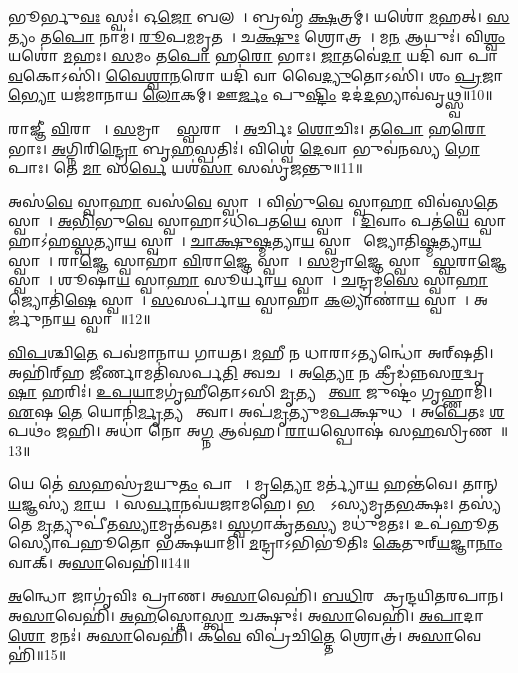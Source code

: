    𑌭𑍂𑌰𑍍𑌭𑍁\ul{𑌵𑌃} 𑌸𑍍𑌵𑌃॑।
   𑌓\ul{𑌜𑍋} 𑌬𑌲𑌮𑍍᳚।
   𑌬𑍍𑌰𑌹𑍍𑌮॑ \ul{𑌕𑍍𑌷}𑌤𑍍𑌰𑌮𑍍।
   𑌯𑌶𑍋॑ \ul{𑌮}𑌹𑌤𑍍।
   \ul{𑌸}𑌤𑍍𑌯𑌂 𑌤\ul{𑌪𑍋} 𑌨𑌾𑌮॑।
   \ul{𑌰𑍂}𑌪\ul{𑌮}𑌮𑍃𑌤𑌮𑍍᳚।
   𑌚\ul{𑌕𑍍𑌷𑍁𑌃} 𑌶𑍍𑌰𑍋𑌤𑍍𑌰𑌮𑍍᳚।
   𑌮\ul{𑌨} 𑌆𑌯𑍁𑌃॑।
   𑌵𑌿\ul{𑌶𑍍𑌵𑌂} 𑌯𑌶𑍋॑ \ul{𑌮}𑌹𑌃।
   \ul{𑌸}𑌮𑌂 𑌤\ul{𑌪𑍋} 𑌹\ul{𑌰𑍋} 𑌭𑌾𑌃।
   \ul{𑌜𑌾}𑌤𑌵𑍇॑\ul{𑌦𑌾} 𑌯𑌦𑌿॑ 𑌵𑌾 𑌪𑌾\ul{𑌵}𑌕𑍋𑌽𑌸𑌿॑।
   \ul{𑌵𑍈}\ul{𑌶𑍍𑌵𑌾}\ul{𑌨}𑌰𑍋 𑌯𑌦𑌿॑ 𑌵𑌾 𑌵𑍈\ul{𑌦𑍍𑌯𑍁}𑌤𑍋𑌽𑌸𑌿॑।
   𑌶𑌂 \ul{𑌪𑍍𑌰}𑌜𑌾\ul{𑌭𑍍𑌯𑍋} 𑌯𑌜॑𑌮𑌾𑌨𑌾𑌯 \ul{𑌲𑍋}𑌕𑌮𑍍।
   𑌊\ul{𑌰𑍍𑌜𑌂} 𑌪𑍁\ul{𑌷𑍍𑌟𑌿𑌂} 𑌦𑌦॑\ul{𑌦}𑌭𑍍𑌯𑌾𑌵॑𑌵𑍃𑌥𑍍𑌸𑍍𑌵॥10॥
   \anuvakamend

   𑌰𑌾𑌜𑍍𑌞𑍀॑ \ul{𑌵𑌿}𑌰𑌾𑌜𑍍𑌞𑍀᳚।
   \ul{𑌸}𑌮𑍍𑌰𑌾𑌜𑍍𑌞𑍀᳚ \ul{𑌸𑍍𑌵}𑌰𑌾𑌜𑍍𑌞𑍀᳚।
   \ul{𑌅}𑌰𑍍𑌚𑌿𑌃 \ul{𑌶𑍋}𑌚𑌿𑌃।
   𑌤\ul{𑌪𑍋} 𑌹\ul{𑌰𑍋} 𑌭𑌾𑌃।
   \ul{𑌅}𑌗𑍍𑌨𑌿𑌰𑌿\ul{𑌨𑍍𑌦𑍍𑌰𑍋} 𑌬𑍃\ul{𑌹}𑌸𑍍𑌪𑌤𑌿𑌃॑।
   𑌵𑌿𑌶𑍍𑌵𑍇॑ \ul{𑌦𑍇}𑌵𑌾 𑌭𑍁𑌵॑𑌨𑌸𑍍𑌯 \ul{𑌗𑍋}𑌪𑌾𑌃।
   𑌤𑍇 \ul{𑌮𑌾} 𑌸\ul{𑌰𑍍𑌵𑍇} 𑌯𑌶॑\ul{𑌸𑌾} 𑌸𑌸𑍃॑𑌜𑌨𑍍𑌤𑍁॥11॥
\anuvakamend

   𑌅𑌸॑\ul{𑌵𑍇} 𑌸𑍍𑌵𑌾\ul{𑌹𑌾} 𑌵𑌸॑\ul{𑌵𑍇} 𑌸𑍍𑌵𑌾𑌹𑌾᳚।
   𑌵𑌿𑌭𑍁॑\ul{𑌵𑍇} 𑌸𑍍𑌵𑌾\ul{𑌹𑌾} 𑌵𑌿𑌵॑𑌸𑍍𑌵\ul{𑌤𑍇} 𑌸𑍍𑌵𑌾𑌹𑌾᳚।
   \ul{𑌅}\ul{𑌭𑌿}𑌭𑍁\ul{𑌵𑍇} 𑌸𑍍𑌵𑌾𑌹𑌾𑌽𑌧𑌿॑𑌪𑌤\ul{𑌯𑍇} 𑌸𑍍𑌵𑌾𑌹𑌾᳚।
   \ul{𑌦𑌿}𑌵𑌾𑌂 𑌪𑌤॑\ul{𑌯𑍇} 𑌸𑍍𑌵𑌾𑌹𑌾𑌽॑𑌹\ul{𑌸𑍍𑌪}𑌤𑍍𑌯𑌾\ul{𑌯} 𑌸𑍍𑌵𑌾𑌹𑌾᳚।
   \ul{𑌚𑌾}\ul{𑌕𑍍𑌷𑍁}\ul{𑌷𑍍𑌮}𑌤𑍍𑌯𑌾\ul{𑌯} 𑌸𑍍𑌵𑌾𑌹𑌾᳚ 𑌜𑍍𑌯𑍋𑌤𑌿\ul{𑌷𑍍𑌮}𑌤𑍍𑌯𑌾\ul{𑌯} 𑌸𑍍𑌵𑌾𑌹𑌾᳚।
   𑌰𑌾\ul{𑌜𑍍𑌞𑍇} 𑌸𑍍𑌵𑌾𑌹𑌾॑ \ul{𑌵𑌿}𑌰𑌾\ul{𑌜𑍍𑌞𑍇} 𑌸𑍍𑌵𑌾𑌹𑌾᳚।
   \ul{𑌸}𑌮𑍍𑌰𑌾\ul{𑌜𑍍𑌞𑍇} 𑌸𑍍𑌵𑌾𑌹𑌾᳚ \ul{𑌸𑍍𑌵}𑌰𑌾\ul{𑌜𑍍𑌞𑍇} 𑌸𑍍𑌵𑌾𑌹𑌾᳚।
   𑌶𑍂𑌷𑌾॑\ul{𑌯} 𑌸𑍍𑌵𑌾\ul{𑌹𑌾} 𑌸𑍂𑌰𑍍𑌯𑌾॑\ul{𑌯} 𑌸𑍍𑌵𑌾𑌹𑌾᳚।
   \ul{𑌚}𑌨𑍍𑌦𑍍𑌰𑌮॑\ul{𑌸𑍇} 𑌸𑍍𑌵𑌾\ul{𑌹𑌾} 𑌜𑍍𑌯𑍋𑌤𑌿॑\ul{𑌷𑍇} 𑌸𑍍𑌵𑌾𑌹𑌾᳚।
   \ul{𑌸}\ul{}𑌸𑌰𑍍𑌪𑌾॑\ul{𑌯} 𑌸𑍍𑌵𑌾𑌹𑌾॑ \ul{𑌕}𑌲𑍍𑌯𑌾𑌣𑌾॑\ul{𑌯} 𑌸𑍍𑌵𑌾𑌹𑌾᳚।
   𑌅𑌰𑍍𑌜𑍁॑𑌨𑌾\ul{𑌯} 𑌸𑍍𑌵𑌾𑌹𑌾᳚॥12॥
\anuvakamend

   \ul{𑌵𑌿}\ul{𑌪}𑌶𑍍𑌚𑌿\ul{𑌤𑍇} 𑌪𑌵॑𑌮𑌾𑌨𑌾𑌯 𑌗𑌾𑌯𑌤।
   \ul{𑌮}𑌹𑍀 𑌨 𑌧𑌾𑌰𑌾𑌽𑌤𑍍𑌯𑌨𑍍𑌧𑍋॑ 𑌅𑌰𑍍{‌}𑌷𑌤𑌿।
   𑌅𑌹𑌿॑𑌰𑍍{‌}𑌹 \ul{𑌜𑍀}𑌰𑍍𑌣𑌾𑌮𑌤𑌿॑𑌸𑌰𑍍𑌪\ul{𑌤𑌿} 𑌤𑍍𑌵𑌚𑌮𑍍᳚।
   𑌅\ul{𑌤𑍍𑌯𑍋} 𑌨 𑌕𑍍𑌰𑍀𑌡॑𑌨𑍍𑌨𑌸\ul{𑌰}𑌦𑍍𑌵𑍃\ul{𑌷𑌾} 𑌹𑌰𑌿𑌃॑।
   \ul{𑌉}\ul{𑌪}\ul{𑌯𑌾}𑌮𑌗𑍃॑𑌹𑍀𑌤𑍋𑌽𑌸𑌿 \ul{𑌮𑍃}𑌤𑍍𑌯𑌵𑍇᳚ \ul{𑌤𑍍𑌵𑌾} 𑌜𑍁𑌷𑍍𑌟𑌂॑ 𑌗𑍃𑌹𑍍𑌣𑌾𑌮𑌿।
   \ul{𑌏}𑌷 \ul{𑌤𑍇} 𑌯𑍋𑌨𑌿॑\ul{𑌰𑍍𑌮𑍃}𑌤𑍍𑌯𑌵𑍇᳚ 𑌤𑍍𑌵𑌾।
   𑌅𑌪॑\ul{𑌮𑍃}𑌤𑍍𑌯𑍁𑌮\ul{𑌪}𑌕𑍍𑌷𑍁𑌧𑌮𑍍᳚।
   𑌅\ul{𑌪𑍇}𑌤𑌃 \ul{𑌶}𑌪𑌥𑌂॑ 𑌜𑌹𑌿।
   𑌅𑌧𑌾॑ 𑌨𑍋 𑌅\ul{𑌗𑍍𑌨} 𑌆𑌵॑𑌹।
   \ul{𑌰𑌾}𑌯𑌸𑍍𑌪𑍋𑌷॑ 𑌸\ul{𑌹}𑌸𑍍𑌰𑌿𑌣𑌮𑍍᳚॥13॥

   𑌯𑍇 𑌤𑍇॑ \ul{𑌸}𑌹𑌸𑍍𑌰॑\ul{𑌮}𑌯𑍁\ul{𑌤𑌂} 𑌪𑌾𑌶𑌾𑌃᳚।
   𑌮𑍃\ul{𑌤𑍍𑌯𑍋} 𑌮𑌰𑍍𑌤𑍍𑌯𑌾॑\ul{𑌯} 𑌹𑌨𑍍𑌤॑𑌵𑍇।
   𑌤𑌾𑌨𑍍 \ul{𑌯}𑌜𑍍𑌞𑌸𑍍𑌯॑ \ul{𑌮𑌾}𑌯𑌯𑌾᳚।
   𑌸\ul{𑌰𑍍𑌵𑌾}𑌨𑌵॑𑌯𑌜𑌾𑌮𑌹𑍇।
   \ul{𑌭}𑌕𑍍𑌷𑍋᳚𑌽𑌸𑍍𑌯𑌮𑍃𑌤\ul{𑌭}𑌕𑍍𑌷𑌃।
   𑌤𑌸𑍍𑌯॑ 𑌤𑍇 \ul{𑌮𑍃}𑌤𑍍𑌯𑍁𑌪𑍀॑𑌤\ul{𑌸𑍍𑌯𑌾}𑌮𑍃𑌤॑𑌵𑌤𑌃।
   \ul{𑌸𑍍𑌵}𑌗𑌾𑌕𑍃॑𑌤\ul{𑌸𑍍𑌯} 𑌮𑌧𑍁॑𑌮𑌤𑌃।
   𑌉𑌪॑𑌹𑍂\ul{𑌤}𑌸𑍍𑌯𑍋𑌪॑𑌹𑍂𑌤𑍋 𑌭𑌕𑍍𑌷𑌯𑌾𑌮𑌿।
   \ul{𑌮}𑌨𑍍𑌦𑍍𑌰𑌾𑌽𑌭𑌿𑌭𑍂॑𑌤𑌿𑌃 \ul{𑌕𑍇}𑌤𑍁𑌰𑍍{‌}\ul{𑌯}𑌜𑍍𑌞𑌾\ul{𑌨𑌾𑌂} 𑌵𑌾𑌕𑍍।
   𑌅\ul{𑌸𑌾}𑌵𑍇𑌹𑌿॑॥14॥

   \ul{𑌅}𑌨𑍍𑌧𑍋 𑌜𑌾𑌗𑍃॑𑌵𑌿𑌃 𑌪𑍍𑌰𑌾𑌣।
   𑌅\ul{𑌸𑌾}𑌵𑍇𑌹𑌿॑।
   \ul{𑌬}\ul{𑌧𑌿}𑌰 𑌆᳚𑌕𑍍𑌰𑌨𑍍𑌦𑌯𑌿𑌤𑌰𑌪𑌾𑌨।
   𑌅\ul{𑌸𑌾}𑌵𑍇𑌹𑌿॑।
   \ul{𑌅}\ul{𑌹}𑌸𑍍𑌤𑍋\ul{𑌸𑍍𑌤𑍍𑌵𑌾} 𑌚𑌕𑍍𑌷𑍁𑌃॑।
   𑌅\ul{𑌸𑌾}𑌵𑍇𑌹𑌿॑।
   \ul{𑌅}\ul{𑌪𑌾}𑌦𑌾\ul{𑌶𑍋} 𑌮𑌨𑌃॑।
   𑌅\ul{𑌸𑌾}𑌵𑍇𑌹𑌿॑।
   𑌕\ul{𑌵𑍇} 𑌵𑌿𑌪𑍍𑌰॑𑌚𑌿\ul{𑌤𑍍𑌤𑍇} 𑌶𑍍𑌰𑍋𑌤𑍍𑌰॑।
   𑌅\ul{𑌸𑌾}𑌵𑍇𑌹𑌿॑॥15॥

